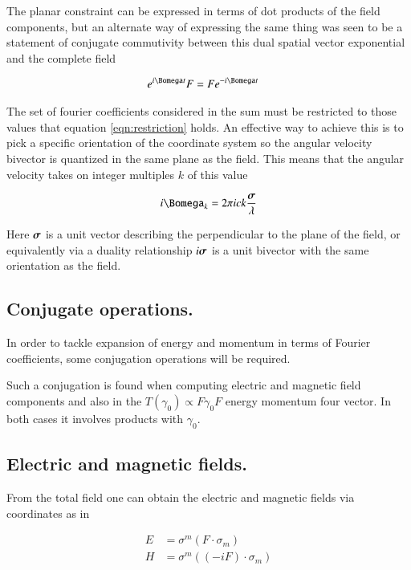 \documentclass{article}
\begin{document}
The planar constraint can be expressed in terms of dot products of the field components, but an alternate way of expressing the same thing was seen to be
a statement of conjugate commutivity between this dual spatial vector exponential and the complete field

\begin{align}\label{eqn:restriction}
e^{ i \Bomega t} F &= F e^{ -i \Bomega t} 
\end{align}

The set of fourier coefficients considered in the sum must be restricted to those values that equation \ref{eqn:restriction} holds.  An effective 
way to achieve this is to 
pick a specific orientation of the coordinate system so the angular
velocity bivector is quantized in the same plane as the field.  This means that
the angular velocity takes on integer multiples $k$ of this value

\begin{align}
i \Bomega_k = 2 \pi i c k \frac{\Bsigma}{\lambda}
\end{align}

Here $\boldsymbol{\sigma}$ is a unit vector describing the perpendicular to the plane of the field, or equivalently via a duality relationship $i \boldsymbol{\sigma}$ is a unit bivector with the same orientation as the field.

\subsection{ Conjugate operations. }

In order to tackle expansion of energy and momentum in terms of Fourier coefficients, some conjugation operations will be required.

Such a conjugation is found when computing electric and magnetic field components and also in the $T(\gamma_0) \propto F \gamma_0 F$ energy 
momentum four vector.  In both cases it involves products with $\gamma_0$.

\subsection{ Electric and magnetic fields. }

From the total field one can 
obtain the electric and magnetic fields via coordinates as in

%
\begin{align*}
E &= \sigma^m (F \cdot \sigma_m) \\
H &= \sigma^m ((-i F) \cdot \sigma_m)
\end{align*}
\end{document}
